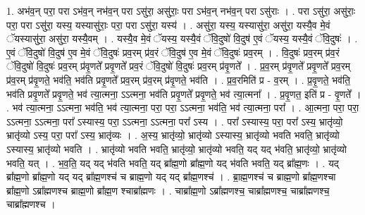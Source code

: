\documentclass[17pt]{extarticle}
\begin{document}
1. अभ॑व॒न् परा॒ परा ऽभ॑व॒न् नभ॑व॒न् परा ऽसु॑रा॒ असु॑राः॒ परा ऽभ॑व॒न् नभ॑व॒न् परा ऽसु॑राः । . परा ऽसु॑रा॒ असु॑राः॒ परा॒ परा ऽसु॑रा॒ यस्य॒ यस्यासु॑राः॒ परा॒ परा ऽसु॑रा॒ यस्य॑ । . असु॑रा॒ यस्य॒ यस्यासु॑रा॒ असु॑रा॒ यस्यै॒व मे॒वं ॅयस्यासु॑रा॒ असु॑रा॒ यस्यै॒वम् । . यस्यै॒व मे॒वं ॅयस्य॒ यस्यै॒वं ॅवि॒दुषो॑ वि॒दुष॑ ए॒वं ॅयस्य॒ यस्यै॒वं ॅवि॒दुषः॑ । . ए॒वं ॅवि॒दुषो॑ वि॒दुष॑ ए॒व मे॒वं ॅवि॒दुषः॑ प्रव॒रम् प्र॑व॒रं ॅवि॒दुष॑ ए॒व मे॒वं ॅवि॒दुषः॑ प्रव॒रम् । . वि॒दुषः॑ प्रव॒रम् प्र॑व॒रं ॅवि॒दुषो॑ वि॒दुषः॑ प्रव॒रम् प्र॑वृ॒णते᳚ प्रवृ॒णते᳚ प्रव॒रं ॅवि॒दुषो॑ वि॒दुषः॑ प्रव॒रम् प्र॑वृ॒णते᳚ । . प्र॒व॒रम् प्र॑वृ॒णते᳚ प्रवृ॒णते᳚ प्रव॒रम् प्र॑व॒रम् प्र॑वृ॒णते॒ भव॑ति॒ भव॑ति प्रवृ॒णते᳚ प्रव॒रम् प्र॑व॒रम् प्र॑वृ॒णते॒ भव॑ति । . प्र॒व॒रमिति॑ प्र - व॒रम् । . प्र॒वृ॒णते॒ भव॑ति॒ भव॑ति प्रवृ॒णते᳚ प्रवृ॒णते॒ भव॑ त्या॒त्मना॒ ऽऽत्मना॒ भव॑ति प्रवृ॒णते᳚ प्रवृ॒णते॒ भव॑ त्या॒त्मना᳚ । . प्र॒वृ॒णत॒ इति॑ प्र - वृ॒णते᳚ । . भव॑ त्या॒त्मना॒ ऽऽत्मना॒ भव॑ति॒ भव॑ त्या॒त्मना॒ परा॒ परा॒ ऽऽत्मना॒ भव॑ति॒ भव॑ त्या॒त्मना॒ परा᳚ । . आ॒त्मना॒ परा॒ परा॒ ऽऽत्मना॒ ऽऽत्मना॒ परा᳚ ऽस्यास्य॒ परा॒ ऽऽत्मना॒ ऽऽत्मना॒ परा᳚ ऽस्य । . परा᳚ ऽस्यास्य॒ परा॒ परा᳚ ऽस्य॒ भ्रातृ॑व्यो॒ भ्रातृ॑व्यो ऽस्य॒ परा॒ परा᳚ ऽस्य॒ भ्रातृ॑व्यः । . अ॒स्य॒ भ्रातृ॑व्यो॒ भ्रातृ॑व्यो ऽस्यास्य॒ भ्रातृ॑व्यो भवति भवति॒ भ्रातृ॑व्यो ऽस्यास्य॒ भ्रातृ॑व्यो भवति । . भ्रातृ॑व्यो भवति भवति॒ भ्रातृ॑व्यो॒ भ्रातृ॑व्यो भवति॒ यद् यद् भ॑वति॒ भ्रातृ॑व्यो॒ भ्रातृ॑व्यो भवति॒ यत् । . भ॒व॒ति॒ यद् यद् भ॑वति भवति॒ यद् ब्रा᳚ह्म॒णो ब्रा᳚ह्म॒णो यद् भ॑वति भवति॒ यद् ब्रा᳚ह्म॒णः । . यद् ब्रा᳚ह्म॒णो ब्रा᳚ह्म॒णो यद् यद् ब्रा᳚ह्म॒णश्च॑ च ब्राह्म॒णो यद् यद् ब्रा᳚ह्म॒णश्च॑ । . ब्रा॒ह्म॒णश्च॑ च ब्राह्म॒णो ब्रा᳚ह्म॒णश्चा ब्रा᳚ह्म॒णो ऽब्रा᳚ह्मणश्च ब्राह्म॒णो ब्रा᳚ह्म॒ण श्चाब्रा᳚ह्मणः । . चाब्रा᳚ह्म॒णो ऽब्रा᳚ह्मणश्च॒ चाब्रा᳚ह्मणश्च॒ चाब्रा᳚ह्मणश्च॒ चाब्रा᳚ह्मणश्च । \newline
\end{document}
